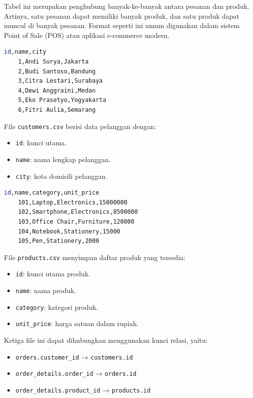 Tabel ini merupakan penghubung banyak-ke-banyak antara pesanan dan produk. Artinya, satu pesanan dapat memiliki banyak produk, dan satu produk dapat muncul di banyak pesanan. Format seperti ini umum digunakan dalam sistem Point of Sale (POS) atau aplikasi e-commerce modern.


\begin{lstlisting}[language=bash, caption={Contoh isi file \texttt{customers.csv}}, label={lst:customers_csv}]
	id,name,city
	1,Andi Surya,Jakarta
	2,Budi Santoso,Bandung
	3,Citra Lestari,Surabaya
	4,Dewi Anggraini,Medan
	5,Eko Prasetyo,Yogyakarta
	6,Fitri Aulia,Semarang
\end{lstlisting}

File \texttt{customers.csv} berisi data pelanggan dengan:
\begin{itemize}
	\item \texttt{id}: kunci utama.
	\item \texttt{name}: nama lengkap pelanggan.
	\item \texttt{city}: kota domisili pelanggan.
\end{itemize}

\begin{lstlisting}[language=bash, caption={Contoh isi file \texttt{products.csv}}, label={lst:products_csv}]
	id,name,category,unit_price
	101,Laptop,Electronics,15000000
	102,Smartphone,Electronics,8500000
	103,Office Chair,Furniture,120000
	104,Notebook,Stationery,15000
	105,Pen,Stationery,2000
\end{lstlisting}

File \texttt{products.csv} menyimpan daftar produk yang tersedia:
\begin{itemize}
	\item \texttt{id}: kunci utama produk.
	\item \texttt{name}: nama produk.
	\item \texttt{category}: kategori produk.
	\item \texttt{unit\_price}: harga satuan dalam rupiah.
\end{itemize}

Ketiga file ini dapat dihubungkan menggunakan kunci relasi, yaitu:
\begin{itemize}
	\item \texttt{orders.customer\_id} → \texttt{customers.id}
	\item \texttt{order\_details.order\_id} → \texttt{orders.id}
	\item \texttt{order\_details.product\_id} → \texttt{products.id}
\end{itemize}


